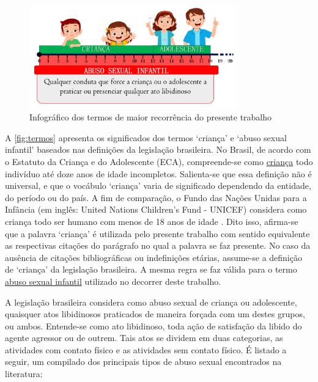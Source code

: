 \begin{figure}[htb]
	\caption{\label{fig:termos}Infográfico dos termos de maior recorrência do presente trabalho}
	\begin{center}
	    \includegraphics[width=0.8\textwidth]{./Figuras/Termos.pdf}
	\end{center}
\end{figure}


A \autoref{fig:termos} apresenta os significados dos termos `criança' e `abuso sexual infantil' baseados nas definições da legislação brasileira. No Brasil, de acordo com o Estatuto da Criança e do Adolescente (ECA), compreende-se como \underline{crian}ç\underline{a} todo indivíduo até doze anos de idade incompletos. Salienta-se que essa definição não é universal, e que o vocábulo `criança' varia de significado dependendo da entidade, do período ou do país. A fim de comparação, o Fundo das Nações Unidas para a Infância (em inglês: United Nations Children’s Fund - UNICEF) considera como criança todo ser humano com menos de 18 anos de idade \cite{brasil1988convenccao}. Dito isso, afirma-se que a palavra `criança' é utilizada pelo presente trabalho com sentido equivalente as respectivas citações do parágrafo no qual a palavra se faz presente. No caso da ausência de citações bibliográficas ou indefinições etárias, assume-se a definição de `criança' da legislação brasileira. A mesma regra se faz válida para o termo \underline{abuso sexual infantil} utilizado no decorrer deste trabalho.

A legislação brasileira considera como abuso sexual de criança ou adolescente, quaisquer atos libidinosos praticados de maneira forçada com um destes grupos, ou ambos. Entende-se como ato libidinoso, toda ação de satisfação da libido do agente agressor ou de outrem. Tais atos se dividem em duas categorias, as atividades com contato físico e as atividades sem contato físico. É listado a seguir, um compilado dos principais tipos de abuso sexual encontrados na literatura: 

